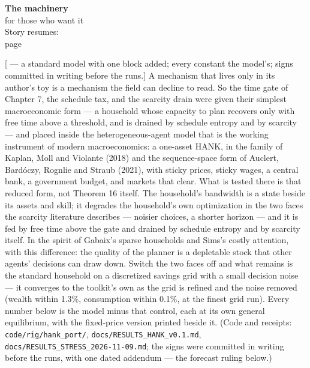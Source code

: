 \begin{machinery}{\textbf{The machinery}\\for those who want it\\[3pt]{\color{muted}Story resumes:\\page~\pageref{ch15}}}


{\sffamily\fontsize{8.6}{12.2}\selectfont\color{trackc}[ --- a standard model with one block added; every constant
the model's; signs committed in writing before the runs.]} A mechanism
that lives only in its author's toy is a mechanism the field can
decline to read. So the time gate of Chapter 7, the schedule tax, and
the scarcity drain were given their simplest macroeconomic form --- a
household whose capacity to plan recovers only with free time above a
threshold, and is drained by schedule entropy and by scarcity --- and
placed inside the heterogeneous-agent model that is the working
instrument of modern macroeconomics: a one-asset HANK, in the family
of Kaplan, Moll and Violante (2018) and the sequence-space form of
Auclert, Bardóczy, Rognlie and Straub (2021), with sticky prices,
sticky wages, a central bank, a government budget, and markets that
clear. What is tested there is that reduced form, not Theorem 16
itself. The household's bandwidth is a state beside its
assets and skill; it degrades the household's own optimization in the
two faces the scarcity literature describes --- noisier choices, a
shorter horizon --- and it is fed by free time above the gate and
drained by schedule entropy and by scarcity itself. In the spirit of
Gabaix's sparse households and Sims's costly attention, with this
difference: the quality of the planner is a depletable stock that
other agents' decisions can draw down. Switch the two faces off and
what remains is the standard household on a discretized savings grid
with a small decision noise --- it converges to the toolkit's own as the
grid is refined and the noise removed (wealth within 1.3\%, consumption
within 0.1\%, at the finest grid run). Every number below is the model
minus that control, each at its own general equilibrium, with the
fixed-price version printed beside it. (Code and receipts:
\texttt{code/\allowbreak{}rig/\allowbreak{}hank\_\allowbreak{}port/\allowbreak{}}, \texttt{docs/\allowbreak{}RESULTS\_\allowbreak{}HANK\_\allowbreak{}v0.\allowbreak{}1.\allowbreak{}md},
\texttt{docs/\allowbreak{}RESULTS\_\allowbreak{}STRESS\_\allowbreak{}2026-11-09.\allowbreak{}md}; the signs were committed in
writing before the runs, with one dated addendum --- the forecast ruling
below.)


\end{machinery}
